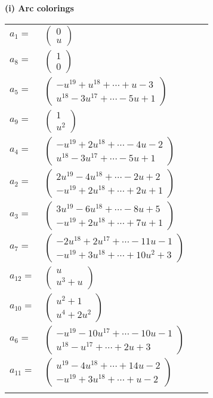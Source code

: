 \documentclass[1p]{elsarticle_modified}
\theoremstyle{definition}
\begin{document}
\flushleft \textbf{(i) Arc colorings}\\
\begin{tabular}{m{7pt} m{180pt} m{7pt} m{180pt} }
\flushright $a_{1}=$&$\begin{pmatrix}0\\u\end{pmatrix}$ \\
\flushright $a_{8}=$&$\begin{pmatrix}1\\0\end{pmatrix}$ \\
\flushright $a_{5}=$&$\begin{pmatrix}- u^{19}+u^{18}+\cdots+u-3\\u^{18}-3 u^{17}+\cdots-5 u+1\end{pmatrix}$ \\
\flushright $a_{9}=$&$\begin{pmatrix}1\\u^2\end{pmatrix}$ \\
\flushright $a_{4}=$&$\begin{pmatrix}- u^{19}+2 u^{18}+\cdots-4 u-2\\u^{18}-3 u^{17}+\cdots-5 u+1\end{pmatrix}$ \\
\flushright $a_{2}=$&$\begin{pmatrix}2 u^{19}-4 u^{18}+\cdots-2 u+2\\- u^{19}+2 u^{18}+\cdots+2 u+1\end{pmatrix}$ \\
\flushright $a_{3}=$&$\begin{pmatrix}3 u^{19}-6 u^{18}+\cdots-8 u+5\\- u^{19}+2 u^{18}+\cdots+7 u+1\end{pmatrix}$ \\
\flushright $a_{7}=$&$\begin{pmatrix}-2 u^{18}+2 u^{17}+\cdots-11 u-1\\- u^{19}+3 u^{18}+\cdots+10 u^2+3\end{pmatrix}$ \\
\flushright $a_{12}=$&$\begin{pmatrix}u\\u^3+u\end{pmatrix}$ \\
\flushright $a_{10}=$&$\begin{pmatrix}u^2+1\\u^4+2 u^2\end{pmatrix}$ \\
\flushright $a_{6}=$&$\begin{pmatrix}- u^{19}-10 u^{17}+\cdots-10 u-1\\u^{18}- u^{17}+\cdots+2 u+3\end{pmatrix}$ \\
\flushright $a_{11}=$&$\begin{pmatrix}u^{19}-4 u^{18}+\cdots+14 u-2\\- u^{19}+3 u^{18}+\cdots+u-2\end{pmatrix}$\\&\end{tabular}
\end{document}
